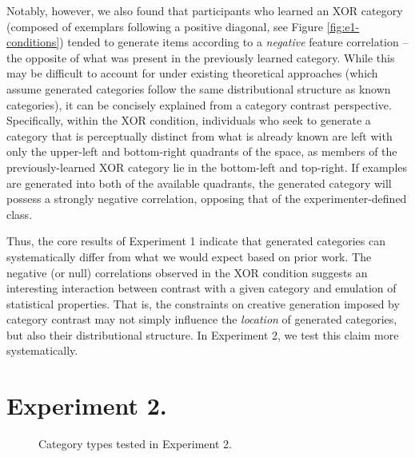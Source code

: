 \documentclass[12pt]{article}
\begin{document}
\begin{flushleft}
Notably, however, we also found that participants who learned an XOR category
(composed of exemplars following a positive diagonal, see Figure
\ref{fig:e1-conditions}) tended to generate items according to a {\em negative}
feature correlation -- the opposite of what was present in the previously
learned category. While this may be difficult to account for under existing
theoretical approaches (which assume generated categories follow the same
distributional structure as known categories), it can be concisely explained
from a category contrast perspective. Specifically, within the XOR condition,
individuals who seek to generate a category that is perceptually distinct from
what is already known are left with only the upper-left and bottom-right
quadrants of the space, as members of the previously-learned XOR category lie in
the bottom-left and top-right. If examples are generated into both of the
available quadrants, the generated category will possess a strongly negative
correlation, opposing that of the experimenter-defined class.

Thus, the core results of Experiment 1 indicate that generated categories can
systematically differ from what we would expect based on prior work. The
negative (or null) correlations observed in the XOR condition suggests an
interesting interaction between contrast with a given category and emulation of
statistical properties. That is, the constraints on creative generation imposed
by category contrast may not simply influence the {\em location} of generated
categories, but also their distributional structure. In Experiment 2, we test
this claim more systematically.


\section{Experiment 2.}

\begin{figure}
    \begin{center} 
    \caption{Category types tested in Experiment 2.}
    \label{fig:e2-conditions}
    \end{center}
\end{figure}


\end{flushleft}
\end{document}
